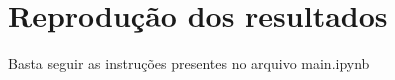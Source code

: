 \section{Reprodução dos resultados}
\label{sec:results}

Basta seguir as instruções presentes no arquivo main.ipynb